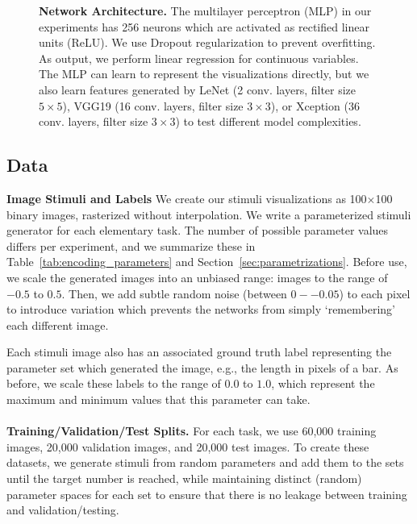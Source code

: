 \begin{figure}[t]
	\centering
	
	\hfill

  \caption{\textbf{Network Architecture.} The multilayer perceptron (MLP) in our experiments has 256 neurons which are activated as rectified linear units (ReLU). We use Dropout regularization to prevent overfitting. As output, we perform linear regression for continuous variables. The MLP can learn to represent the visualizations directly, but we also learn features generated by LeNet (2 conv. layers, filter size $5\times5$), VGG19 (16 conv. layers, filter size $3\times3$), or Xception (36 conv. layers, filter size $3\times3$) to test different model complexities.}
	\label{fig:classifiers}
\end{figure}

\subsection{Data}
\label{sec:data}

\noindent\textbf{Image Stimuli and Labels} 
We create our stimuli visualizations as 100$\times$100 binary images, rasterized without interpolation. We write a parameterized stimuli generator for each elementary task. The number of possible parameter values differs per experiment, and we summarize these in Table~\ref{tab:encoding_parameters} and Section~\ref{sec:parametrizations}. Before use, we scale the generated images into an unbiased range: images to the range of $-0.5$ to $0.5$. Then, we add subtle random noise (between $0--0.05$) to each pixel to introduce variation which prevents the networks from simply `remembering' each different image.

Each stimuli image also has an associated ground truth label representing the parameter set which generated the image, e.g., the length in pixels of a bar. As before, we scale these labels to the range of $0.0$ to $1.0$, which represent the maximum and minimum values that this parameter can take.
\\~\\
\noindent\textbf{Training/Validation/Test Splits.} For each task, we use 60,000 training images, 20,000 validation images, and 20,000 test images. To create these datasets, we generate stimuli from random parameters and add them to the sets until the target number is reached, while maintaining distinct (random) parameter spaces for each set to ensure that there is no leakage between training and validation/testing.

